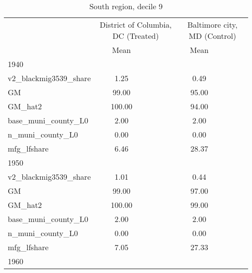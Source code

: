 \begin{table}[htbp]\centering
\def\sym#1{\ifmmode^{#1}\else\(^{#1}\)\fi}
\caption{South region, decile 9 \label{tab1}}
\begin{tabular}{l*{2}{ccc}}
\toprule
                    &\multicolumn{3}{c}{District of Columbia, DC (Treated)}&\multicolumn{3}{c}{Baltimore city, MD (Control)}\\
                    &        Mean&            &            &        Mean&            &            \\
\midrule
1940                &            &            &            &            &            &            \\
v2\_blackmig3539\_share&        1.25&            &            &        0.49&            &            \\
GM                  &       99.00&            &            &       95.00&            &            \\
GM\_hat2             &      100.00&            &            &       94.00&            &            \\
base\_muni\_county\_L0 &        2.00&            &            &        2.00&            &            \\
n\_muni\_county\_L0    &        0.00&            &            &        0.00&            &            \\
mfg\_lfshare         &        6.46&            &            &       28.37&            &            \\
\midrule
1950                &            &            &            &            &            &            \\
v2\_blackmig3539\_share&        1.01&            &            &        0.44&            &            \\
GM                  &       99.00&            &            &       97.00&            &            \\
GM\_hat2             &      100.00&            &            &       99.00&            &            \\
base\_muni\_county\_L0 &        2.00&            &            &        2.00&            &            \\
n\_muni\_county\_L0    &        0.00&            &            &        0.00&            &            \\
mfg\_lfshare         &        7.05&            &            &       27.33&            &            \\
\midrule
1960                &            &            &            &            &            &            \\

\end{tabular}
\end{table}
